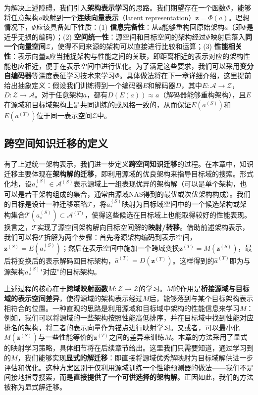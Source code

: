 \documentclass[../main.tex]{subfiles}
\begin{document}
为解决上述障碍，我们引入\textbf{架构表示学习}的思路。我们期望存在一个函数$\Phi$，能够将任意架构$a$映射到一个\textbf{连续向量表示}（latent representation）$\mathbf{z} = \Phi(a)$。理想情况下，$\Phi$应该具备如下性质：(1) \textbf{信息完备性}：从$\mathbf{z}$能够重构回原始架构$a$（即$\Phi$是近乎无损的编码）；(2) \textbf{空间统一性}：源空间和目标空间的架构经过$\Phi$映射后落入\textbf{同一个向量空间}$\mathcal{Z}$，使得不同来源的架构可以直接进行比较和运算；(3) \textbf{性能相关性}：表示向量$\mathbf{z}$应当捕捉架构与性能之间的关联，即距离相近的表示对应的架构性能也应相近，便于在表示空间中进行优化。为了满足这些要求，我们可以采用\textbf{变分自编码器}等深度表征学习技术来学习$\Phi$。具体做法将在下一章详细介绍，这里提前给出抽象定义：假设我们训练得到一个编码器$E$和解码器$D$，其中$E: \mathcal{A} \to \mathcal{Z}$，$D: \mathcal{Z} \to \mathcal{A}$。对于任意架构$a$，都有$D(E(a)) \approx a$（解码器能够重构架构），且$E$在源域和目标域架构上是共同训练的或风格一致的，从而保证$E(a^{(S)})$和$E(a^{(T)})$位于同一表示空间$\mathcal{Z}$中。

\subsection{跨空间知识迁移的定义}

有了上述统一架构表示，我们进一步定义\textbf{跨空间知识迁移}的过程。在本章中，知识迁移主要体现在\textbf{架构解的迁移}，即利用源域的优良架构来指导目标域的搜索。形式化地，设$a^{(S)}_* \in \mathcal{A}^{(S)}$表示源域上一组表现优异的架构解（可以是单个架构，也可以是若干架构组成的集合，通常由源域NAS得到的最优或次优架构构成）。我们的目标是设计一种迁移策略$\mathcal{T}$，将$a^{(S)}_*$映射为目标域空间中的一个候选架构或架构集合$\mathcal{T}(a^{(S)}_*) \subset \mathcal{A}^{(T)}$，使得这些候选在目标域上也能取得较好的性能表现。换言之，$\mathcal{T}$实现了源空间架构解向目标空间解的\textbf{映射/转移}。借助前述架构表示，我们可以将$\mathcal{T}$拆解为两个步骤：首先将源架构编码到表示空间，$\mathbf{z}^{(S)} = E(a^{(S)}_*)$；然后在表示空间中施加一个跨域变换$\mathbf{z}^{(T)} = M(\mathbf{z}^{(S)})$，最后将变换后的表示解码回目标架构，$\hat{a}^{(T)} = D(\mathbf{z}^{(T)})$。这样得到的$\hat{a}^{(T)}$即为与源架构$a^{(S)}_*$"对应"的目标架构。

上述过程的核心在于\textbf{跨域映射函数}$M: \mathcal{Z} \to \mathcal{Z}$的学习。$M$的作用是\textbf{桥接源域与目标域的表示空间差异}，使得源域的架构表示经过$M$后，能够落到与某个目标架构表示相符合的位置。一种直观的思路是利用源域和目标域中架构的性能信息来学习$M$：例如，我们可以将源域的一些架构按照性能高低排序，并在目标域中找到性能对应排名的架构，将二者的表示向量作为锚点进行映射学习。又或者，可以最小化$M(\mathbf{z}^{(S)})$与一些性能等价的$\mathbf{z}^{(T)}$之间的差异来训练$M$。本章的方法采用了显式的映射学习策略，具体细节将在后续章节给出。这里我们只需要知道，通过学习到的$M$，我们能够实现\textbf{显式的解迁移}：即直接将源域优秀解映射为目标域解供进一步评估和优化。这种方案区别于仅利用源域训练一个性能预测器的做法——我们不是间接地指导搜索，而是\textbf{直接提供了一个可供选择的架构解}。正因如此，我们的方法被称为显式解迁移。
\end{document}
